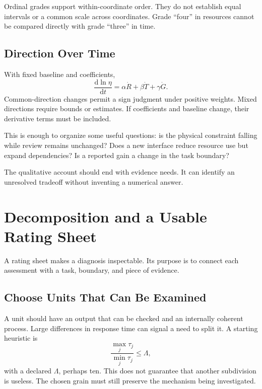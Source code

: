 \documentclass[11pt,openany]{book}
\begin{document}
Ordinal grades support within-coordinate order. They do not establish equal intervals or a common scale across coordinates. Grade “four” in resources cannot be compared directly with grade “three” in time.

\subsection{Direction Over Time}

With fixed baseline and coefficients,
\begin{equation}
 \frac{\mathrm d\ln\eta}{\mathrm dt}
 =\alpha\dot R+\beta\dot T+\gamma\dot G.
\end{equation}
Common-direction changes permit a sign judgment under positive weights. Mixed directions require bounds or estimates. If coefficients and baseline change, their derivative terms must be included.

This is enough to organize some useful questions: is the physical constraint falling while review remains unchanged? Does a new interface reduce resource use but expand dependencies? Is a reported gain a change in the task boundary?

The qualitative account should end with evidence needs. It can identify an unresolved tradeoff without inventing a numerical answer.

\section{Decomposition and a Usable Rating Sheet}

A rating sheet makes a diagnosis inspectable. Its purpose is to connect each assessment with a task, boundary, and piece of evidence.

\subsection{Choose Units That Can Be Examined}

A unit should have an output that can be checked and an internally coherent process. Large differences in response time can signal a need to split it. A starting heuristic is
\begin{equation}
 \frac{\max_j\tau_j}{\min_j\tau_j}\leq\Lambda,
\end{equation}
with a declared $\Lambda$, perhaps ten. This does not guarantee that another subdivision is useless. The chosen grain must still preserve the mechanism being investigated.
\end{document}
